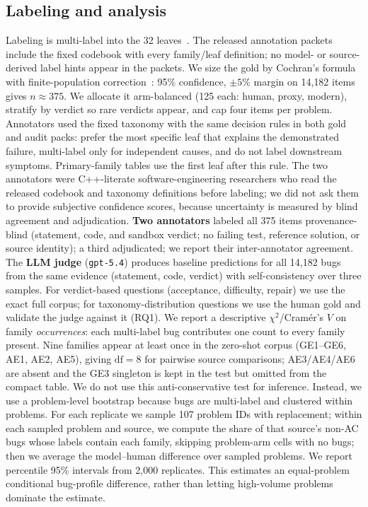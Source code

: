 \documentclass[conference]{IEEEtran}
\begin{document}
\subsection{Labeling and analysis}
Labeling is multi-label into the 32 leaves~\cite{wei2026evaluating}. The released
annotation packets include the fixed codebook with every family/leaf definition; no
model- or source-derived label hints appear in the packets. We size the
gold by Cochran's formula with finite-population
correction~\cite{cochran1977sampling,krejcie1970determining}: 95\% confidence,
$\pm5\%$ margin on 14{,}182 items gives $n\!\approx\!375$. We allocate it
arm-balanced (125 each: human, proxy, modern), stratify by verdict so rare verdicts
appear, and cap four items per problem. Annotators used the fixed taxonomy with the
same decision rules in both gold and audit packs: prefer the most specific leaf that
explains the demonstrated failure, multi-label only for independent causes, and do
not label downstream symptoms. Primary-family tables use the first leaf after this
rule. The two annotators were C++-literate software-engineering researchers who read
the released codebook and taxonomy definitions before labeling; we did not ask them
to provide subjective confidence scores, because uncertainty is measured by blind
agreement and adjudication. \textbf{Two annotators} labeled all 375 items
provenance-blind (statement, code, and sandbox verdict; no failing test, reference
solution, or source identity); a third adjudicated; we report their inter-annotator
agreement. The \textbf{LLM judge}
(\texttt{gpt-5.4}) produces baseline predictions for all 14{,}182 bugs from the same
evidence (statement, code, verdict) with self-consistency over three samples. For verdict-based questions
(acceptance, difficulty, repair) we use the exact full corpus; for
taxonomy-distribution questions we use the human gold and validate the judge
against it (RQ1). We report a descriptive $\chi^2$/Cram\'er's $V$ on family
\emph{occurrences}: each multi-label bug contributes one count to every family present.
Nine families appear at least once in the zero-shot corpus
(GE1--GE6, AE1, AE2, AE5), giving $\mathrm{df}=8$ for pairwise source comparisons;
AE3/AE4/AE6 are absent and the GE3 singleton is kept in the test but omitted from the
compact table. We do not use this anti-conservative test for inference. Instead, we
use a problem-level bootstrap because bugs are multi-label and clustered within
problems. For each replicate we sample 107 problem IDs with replacement; within each
sampled problem and source, we compute the share of that source's non-AC bugs whose
labels contain each family, skipping problem-arm cells with no bugs; then we average
the model--human difference over sampled problems. We report percentile 95\% intervals
from 2{,}000 replicates. This estimates an equal-problem conditional bug-profile
difference, rather than letting high-volume problems dominate the estimate.
\end{document}
